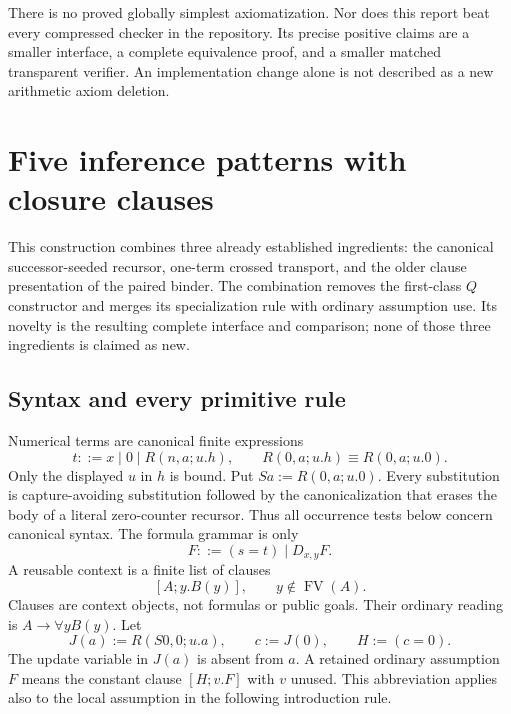 \documentclass[11pt,letterpaper]{article}
\theoremstyle{definition}\newtheorem{definition}[theorem]{Definition}
\begin{document}
There is no proved globally simplest axiomatization. Nor does this report beat every compressed checker in the repository. Its precise positive claims are a smaller interface, a complete equivalence proof, and a smaller matched transparent verifier. An implementation change alone is not described as a new arithmetic axiom deletion.

\section{Five inference patterns with closure clauses}
\label{sec:clause-five}

This construction combines three already established ingredients: the
canonical successor-seeded recursor, one-term crossed transport, and the
older clause presentation of the paired binder. The combination removes
the first-class $Q$ constructor and merges its specialization rule with
ordinary assumption use. Its novelty is the resulting complete interface
and comparison; none of those three ingredients is claimed as new.

\subsection{Syntax and every primitive rule}

Numerical terms are canonical finite expressions
\[
 t::=x\mid0\mid R(n,a;u.h),\qquad
 R(0,a;u.h)\equiv R(0,a;u.0).
\]
Only the displayed $u$ in $h$ is bound. Put
$Sa:=R(0,a;u.0)$. Every substitution is capture-avoiding substitution
followed by the canonicalization that erases the body of a literal
zero-counter recursor. Thus all occurrence tests below concern canonical
syntax. The formula grammar is only
\[
 F::=(s=t)\mid D_{x,y}F.
\]
A reusable context is a finite list of clauses
\[
 [A;y.B(y)],\qquad y\notin\operatorname{FV}(A).
\]
Clauses are context objects, not formulas or public goals. Their ordinary
reading is $A\to\forall yB(y)$. Let
\[
 J(a):=R(S0,0;u.a),\qquad c:=J(0),\qquad H:=(c=0).
\]
The update variable in $J(a)$ is absent from $a$. A retained ordinary
assumption $F$ means the constant clause $[H;v.F]$ with $v$ unused.
This abbreviation applies also to the local assumption in the following
introduction rule.
\end{document}

